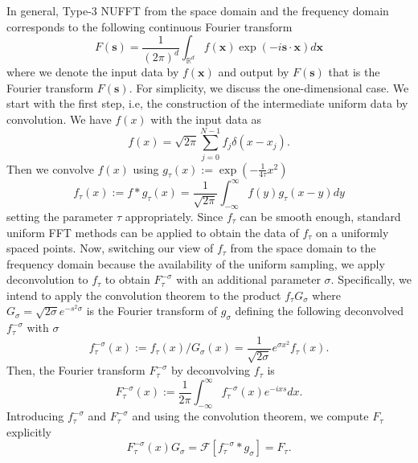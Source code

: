 In general, Type-$3$ NUFFT from the space domain and the frequency domain corresponds to the following continuous Fourier transform
\begin{equation}
    F(\bm{s})
  = \frac{1}{(2\pi)^d} \int_{\mathbb{R}^d}^{}
    f(\bm{x})\exp(-i\bm{s}\cdot\bm{x}) d\bm{x}
\end{equation}
where we denote the input data by $f(\bm{x})$ and output by $F(\bm{s})$ that is the Fourier transform $F(\bm{s})$.
For simplicity, we discuss the one-dimensional case.
We start with the first step, i.e, the construction of the intermediate uniform data by convolution.
We have $f(x)$ with the input data as
\begin{equation}
  f(x) = \sqrt{2\pi}\sum_{j=0}^{N-1}f_j\delta(x-x_j).
\end{equation}
Then we convolve $f(x)$ using $g_{\tau}(x) := \exp(-\frac{1}{4\tau}x^2)$
\begin{equation}
    f_{\tau}(x) := f\ast g_{\tau} (x)
  = \frac{1}{\sqrt{2\pi}} \int_{-\infty}^{\infty} f(y)g_{\tau}(x-y) dy
\end{equation}
setting the parameter $\tau$ appropriately.
Since $f_{\tau}$ can be smooth enough, standard uniform FFT methods can be applied to obtain the data of $f_{\tau}$ on a uniformly spaced points.
Now, switching our view of $f_{\tau}$ from the space domain to the frequency domain because the availability of the uniform sampling, we apply deconvolution to $f_{\tau}$ to obtain $F_{\tau}^{-\sigma}$ with an additional parameter $\sigma$.
Specifically, we intend to apply the convolution theorem to the product $f_{\tau}G_{\sigma}$
where $G_{\sigma} = \sqrt{2\sigma}e^{-s^2\sigma}$ is the Fourier transform of $g_{\sigma}$ defining the following deconvolved $f_{\tau}^{-\sigma}$ with $\sigma$
\begin{equation}
    f_{\tau}^{-\sigma}(x) := f_{\tau}(x)/G_{\sigma}(x)
  = \frac{1}{\sqrt{2\sigma}}e^{\sigma x^2}f_{\tau}(x).
\end{equation}
Then, the Fourier transform $F_{\tau}^{-\sigma}$ by deconvolving $f_{\tau}$ is
\begin{equation}
     F_{\tau}^{-\sigma}(x)
  := \frac{1}{2\pi} \int_{-\infty}^{\infty} f_{\tau}^{-\sigma}(x) e^{-ixs} dx.
\end{equation}
Introducing $f_{\tau}^{-\sigma}$ and $F_{\tau}^{-\sigma}$ and using the convolution theorem,
we compute $F_{\tau}$ explicitly
\begin{equation}
     F_{\tau}^{-\sigma}(x)G_{\sigma}
   = \mathcal{F}[f_{\tau}^{-\sigma}\ast g_{\sigma}]
   = F_{\tau}.
\end{equation}
